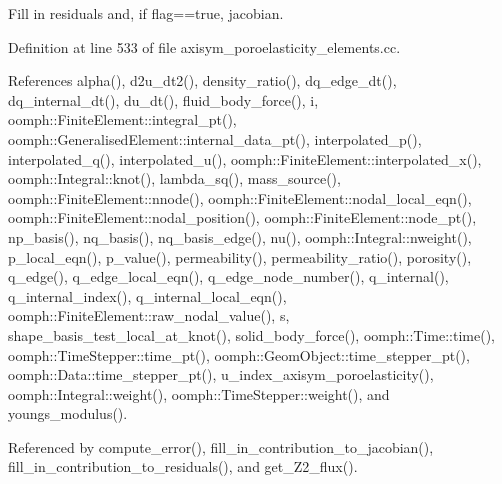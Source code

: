 Fill in residuals and, if flag==true, jacobian. 



Definition at line 533 of file axisym\+\_\+poroelasticity\+\_\+elements.\+cc.



References alpha(), d2u\+\_\+dt2(), density\+\_\+ratio(), dq\+\_\+edge\+\_\+dt(), dq\+\_\+internal\+\_\+dt(), du\+\_\+dt(), fluid\+\_\+body\+\_\+force(), i, oomph\+::\+Finite\+Element\+::integral\+\_\+pt(), oomph\+::\+Generalised\+Element\+::internal\+\_\+data\+\_\+pt(), interpolated\+\_\+p(), interpolated\+\_\+q(), interpolated\+\_\+u(), oomph\+::\+Finite\+Element\+::interpolated\+\_\+x(), oomph\+::\+Integral\+::knot(), lambda\+\_\+sq(), mass\+\_\+source(), oomph\+::\+Finite\+Element\+::nnode(), oomph\+::\+Finite\+Element\+::nodal\+\_\+local\+\_\+eqn(), oomph\+::\+Finite\+Element\+::nodal\+\_\+position(), oomph\+::\+Finite\+Element\+::node\+\_\+pt(), np\+\_\+basis(), nq\+\_\+basis(), nq\+\_\+basis\+\_\+edge(), nu(), oomph\+::\+Integral\+::nweight(), p\+\_\+local\+\_\+eqn(), p\+\_\+value(), permeability(), permeability\+\_\+ratio(), porosity(), q\+\_\+edge(), q\+\_\+edge\+\_\+local\+\_\+eqn(), q\+\_\+edge\+\_\+node\+\_\+number(), q\+\_\+internal(), q\+\_\+internal\+\_\+index(), q\+\_\+internal\+\_\+local\+\_\+eqn(), oomph\+::\+Finite\+Element\+::raw\+\_\+nodal\+\_\+value(), s, shape\+\_\+basis\+\_\+test\+\_\+local\+\_\+at\+\_\+knot(), solid\+\_\+body\+\_\+force(), oomph\+::\+Time\+::time(), oomph\+::\+Time\+Stepper\+::time\+\_\+pt(), oomph\+::\+Geom\+Object\+::time\+\_\+stepper\+\_\+pt(), oomph\+::\+Data\+::time\+\_\+stepper\+\_\+pt(), u\+\_\+index\+\_\+axisym\+\_\+poroelasticity(), oomph\+::\+Integral\+::weight(), oomph\+::\+Time\+Stepper\+::weight(), and youngs\+\_\+modulus().



Referenced by compute\+\_\+error(), fill\+\_\+in\+\_\+contribution\+\_\+to\+\_\+jacobian(), fill\+\_\+in\+\_\+contribution\+\_\+to\+\_\+residuals(), and get\+\_\+\+Z2\+\_\+flux().

\mbox{\label{classoomph_1_1AxisymmetricPoroelasticityEquations_ad1eeb8bb77f7b792cb26c66e3f824d73}} 
